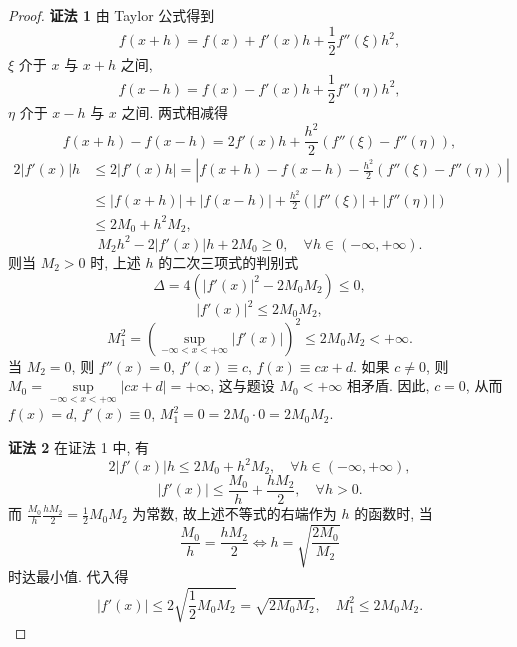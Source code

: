 \begin{proof}
\textbf{证法 1} 由 Taylor 公式得到
\[
f(x+h)=f(x)+f'(x)h+\frac{1}{2}f''(\xi)h^{2},
\]
$\xi$ 介于 $x$ 与 $x+h$ 之间,
\[
f(x-h)=f(x)-f'(x)h+\frac{1}{2}f''(\eta)h^{2},
\]
$\eta$ 介于 $x-h$ 与 $x$ 之间. 两式相减得
\[
f(x+h)-f(x-h)=2f'(x)h+\frac{h^{2}}{2}(f''(\xi)-f''(\eta)),
\]
\begin{align*}
2|f'(x)|h&\leqslant 2|f'(x)h|=\left|f(x+h)-f(x-h)-\frac{h^{2}}{2}(f''(\xi)-f''(\eta))\right|\\
&\leqslant |f(x+h)|+|f(x-h)|+\frac{h^{2}}{2}(|f''(\xi)|+|f''(\eta)|)\\
&\leqslant 2M_{0}+h^{2}M_{2},
\end{align*}
\[
M_{2}h^{2}-2|f'(x)|h+2M_{0}\geqslant 0,\quad \forall h\in(-\infty,+\infty).
\]
则当 $M_{2}>0$ 时, 上述 $h$ 的二次三项式的判别式
\[
\Delta=4(|f'(x)|^{2}-2M_{0}M_{2})\leqslant 0,
\]
\[
|f'(x)|^{2}\leqslant 2M_{0}M_{2},
\]
\[
M_{1}^{2}=\left(\sup_{-\infty<x<+\infty}|f'(x)|\right)^{2}\leqslant 2M_{0}M_{2}<+\infty.
\]
当 $M_{2}=0$, 则 $f''(x)=0$, $f'(x)\equiv c$, $f(x)\equiv cx+d$. 如果 $c\neq 0$, 则 $M_{0}=\sup\limits_{-\infty<x<+\infty}|cx+d|=+\infty$, 这与题设 $M_{0}<+\infty$ 相矛盾. 因此, $c=0$, 从而 $f(x)=d$, $f'(x)\equiv 0$, $M_{1}^{2}=0=2M_{0}\cdot 0=2M_{0}M_{2}$.

\textbf{证法 2} 在证法 1 中, 有
\[
2|f'(x)|h\leqslant 2M_{0}+h^{2}M_{2},\quad \forall h\in(-\infty,+\infty),
\]
\[
|f'(x)|\leqslant\frac{M_{0}}{h}+\frac{hM_{2}}{2},\quad \forall h>0.
\]
而 $\frac{M_{0}}{h}\frac{hM_{2}}{2}=\frac{1}{2}M_{0}M_{2}$ 为常数, 故上述不等式的右端作为 $h$ 的函数时, 当
\[
\frac{M_{0}}{h}=\frac{hM_{2}}{2}\Longleftrightarrow h=\sqrt{\frac{2M_{0}}{M_{2}}}
\]
时达最小值. 代入得
\[
|f'(x)|\leqslant 2\sqrt{\frac{1}{2}M_{0}M_{2}}=\sqrt{2M_{0}M_{2}},\quad M_{1}^{2}\leqslant 2M_{0}M_{2}.
\]
\end{proof}

